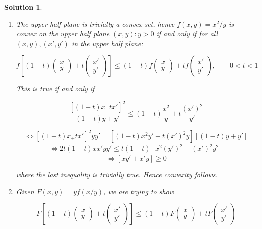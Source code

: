\documentclass[a4paper]{article}
\newtheorem*{soln}{Solution}
\begin{document}
\begin{soln}
\begin{enumerate}
	\item The upper half plane is trivially a convex set, hence $ f(x,y) = x^{2} / y $ is convex on the upper half plane $ (x,y) : y > 0 $ if and only if for all $ (x,y), (x',y') $ in the upper half plane:
	
	\[ f \left[ (1 - t) \begin{pmatrix}
	x \\
	y
	\end{pmatrix}  + t \begin{pmatrix}
	x' \\
	y'
	\end{pmatrix} \right] \leq (1-t) f \begin{pmatrix}
	x \\
	y
	\end{pmatrix} + t f\begin{pmatrix}
	x' \\
	y'
	\end{pmatrix}, \qquad 0 < t < 1 \]
	
	This is true if and only if
	
	\[ \frac{[ (1 - t)x_ + t x' ]^{2}}{(1-t)y + y'} \leq (1-t) \frac{x^{2}}{y} + t \frac{(x')^{2}}{y'} \]
	
	\[ \iff [ (1 - t)x_ + t x' ]^{2}y y' = [(1-t) x^{2}y' + t(x')^{2}y][(1-t)y + y']  \]
	\[ \iff 2t(1-t) xx'yy' \leq t(1-t)\left[ x^{2}(y')^{2} +  (x')^{2}y^{2}\right]  \]
	\[ \iff \left[  xy' + x'y \right] \geq 0 \]
	
	where the last inequality is trivially true. Hence convexity follows.
	
	\item Given $ F(x,y) = y f(x/y) $, we are trying to show
	
	\[ F \left[  (1-t) \begin{pmatrix}
	x\\
	y
	\end{pmatrix} + t \begin{pmatrix}
	x' \\
	y'
	\end{pmatrix} \right] \leq (1-t) F \begin{pmatrix}
	x\\
	y
	\end{pmatrix} + t F \begin{pmatrix}
	x'\\
	y'
	\end{pmatrix} \]
	

\end{enumerate}
\end{soln}
\end{document}
